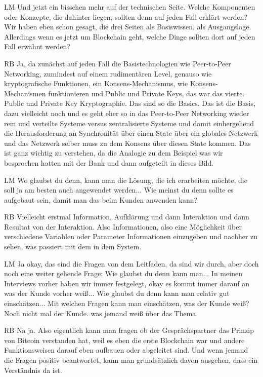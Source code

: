 \begin{xlist}
 \item[LM] Und jetzt ein bisschen mehr auf der technischen Seite. Welche Komponenten oder Konzepte, die dahinter liegen, sollten denn auf jeden Fall erklärt werden? Wir haben eben schon gesagt, die drei Seiten als Basiswissen, als Ausgangslage. Allerdings wenn es jetzt um Blockchain geht, welche Dinge sollten dort auf jeden Fall erwähnt werden?
 \item[RB] Ja, da zunächst auf jeden Fall die Basistechnologien wie Peer-to-Peer Networking, zumindest auf einem rudimentären Level, genauso wie kryptografische Funktionen, ein Konsens-Mechanismus, wie Konsens-Mechanismen funktionieren und Public und Private Keys, das war das vierte. Public und Private Key Kryptographie. Das sind so die Basics. Das ist die Basis, dazu vielleicht noch und es geht eher so in das Peer-to-Peer Networking wieder rein und verteilte Systeme versus zentralisierte Systeme und damit einhergehend die Herausforderung an Synchronität über einen State über ein globales Netzwerk und das Netzwerk selber muss zu dem Konsens über diesen State kommen.  Das ist ganz wichtig zu verstehen, da die Analogie zu dem Beispiel was wir besprochen hatten mit der Bank und dann aufgeteilt in dieses Bild.
 \item[LM] Wo glaubst du denn, kann man die Lösung, die ich erarbeiten möchte, die soll ja am besten auch angewendet werden... Wie meinst du denn sollte es aufgebaut sein, damit man das beim Kunden anwenden kann? 
 \item[RB] Vielleicht erstmal Information, Aufklärung und dann Interaktion und dann Resultat von der Interaktion.  Also Informationen, also eine Möglichkeit über verschiedene Variablen oder Parameter Informationen einzugeben und nachher zu sehen, was passiert mit dem in dem System.
 \item[LM] Ja okay, das sind die Fragen von dem Leitfaden, da sind wir durch, aber doch noch eine weiter gehende Frage: Wie glaubst du denn kann man... In meinen Interviews vorher haben wir immer festgelegt, okay es kommt immer darauf an was der Kunde vorher weiß... Wie glaubst du denn kann man relativ gut einschätzen... Mit welchen Fragen kann man einschätzen, was der Kunde weiß? Noch nicht mal der Kunde. was jemand weiß über das Thema.
 \item[RB] Na ja. Also eigentlich kann man fragen ob der Gesprächspartner das Prinzip von Bitcoin verstanden hat, weil es eben die erste Blockchain war und andere Funktionsweisen darauf eben aufbauen oder abgeleitet sind. Und wenn jemand die Fragen positiv beantwortet, kann man grundsätzlich davon ausgehen, dass ein Verständnis da ist. 

\end{xlist}
